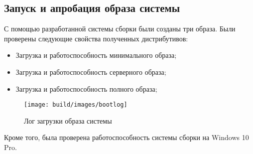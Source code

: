 \subsection{Запуск и апробация образа системы}
С помощью разработанной системы сборки были созданы три образа.
Были проверены следующие свойства полученных дистрибутивов:
\begin{itemize}
  \item Загрузка и работоспособность минимального образа;
  \item Загрузка и работоспособность серверного образа;
  \item Загрузка и работоспособность полного образа;
\end{itemize}
\begin{figure}[h!]
  \centering
  \setlength{\fboxsep}{5pt}
  \texttt{[image: build/images/bootlog]}
  \caption{Лог загрузки образа системы}\label{fig: bootlog}
\end{figure}

Кроме того, была проверена работоспособность системы сборки на Windows 10 Pro.

\newpage
